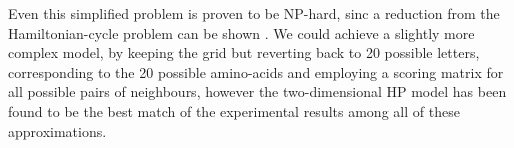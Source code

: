 Even this simplified problem is proven to be NP-hard, sinc a reduction from the Hamiltonian-cycle problem can be shown \cite{crescenzi_complexity_1998}. We could achieve a slightly more complex model, by keeping the grid but reverting back to 20 possible letters, corresponding to the 20 possible amino-acids and employing a scoring matrix for all possible pairs of neighbours, however the two-dimensional HP model has been found to be the best match of the experimental results among all of these approximations. \cite{crescenzi_complexity_1998}

